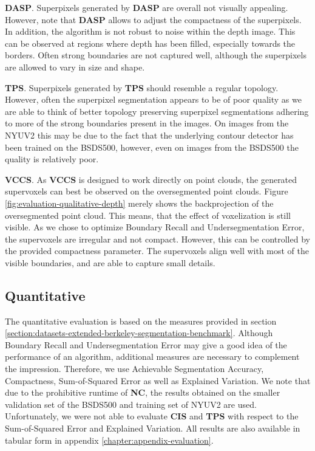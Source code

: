 \textbf{DASP}. Superpixels generated by \textbf{DASP} are overall not visually appealing. However, note that \textbf{DASP} allows to adjust the compactness of the superpixels. In addition, the algorithm is not robust to noise within the depth image. This can be observed at regions where depth has been filled, especially towards the borders. Often strong boundaries are not captured well, although the superpixels are allowed to vary in size and shape.

\textbf{TPS}. Superpixels generated by \textbf{TPS} should resemble a regular topology. However, often the superpixel segmentation appears to be of poor quality as we are able to think of better topology preserving superpixel segmentations \cite{DaiTangHuazhaFuXiaochunCao:2012} adhering to more of the strong boundaries present in the images. On images from the NYUV2 this may be due to the fact that the underlying contour detector \cite{ArbelaezMaireFowlkesMalik:2011} has been trained on the BSDS500, however, even on images from the BSDS500 the quality is relatively poor.

\textbf{VCCS}. As \textbf{VCCS} is designed to work directly on point clouds, the generated supervoxels can best be observed on the oversegmented point clouds. Figure \ref{fig:evaluation-qualitative-depth} merely shows the backprojection of the oversegmented point cloud. This means, that the effect of voxelization is still visible. As we chose to optimize Boundary Recall and Undersegmentation Error, the supervoxels are irregular and not compact. However, this can be controlled by the provided compactness parameter. The supervoxels align well with most of the visible boundaries, and are able to capture small details.

\subsection{Quantitative}

The quantitative evaluation is based on the measures provided in section \ref{section:datasets-extended-berkeley-segmentation-benchmark}. Although Boundary Recall and Undersegmentation Error may give a good idea of the performance of an algorithm, additional measures are necessary to complement the impression. Therefore, we use Achievable Segmentation Accuracy, Compactness, Sum-of-Squared Error as well as Explained Variation. We note that due to the prohibitive runtime of \textbf{NC}, the results obtained on the smaller validation set of the BSDS500 and training set of NYUV2 are used. Unfortunately, we were not able to evaluate \textbf{CIS} and \textbf{TPS} with respect to the Sum-of-Squared Error and Explained Variation. All results are also available in tabular form in appendix \ref{chapter:appendix-evaluation}.

